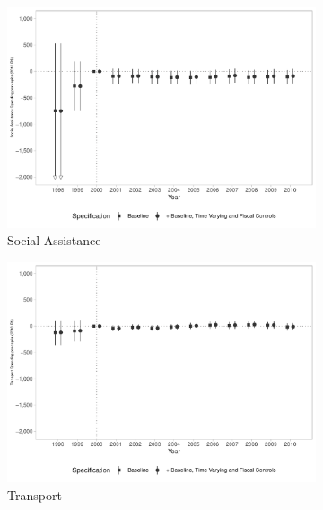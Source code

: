 \begin{figure}[h!]
\begin{center}
\begin{subfigure}{0.48\textwidth}
    \end{subfigure}
    \begin{subfigure}{0.48\textwidth}
        \centering
        \caption{\scriptsize Social Assistance}\label{fig:8c}
        \includegraphics[width=\textwidth]{plots/finbra_desp_assist_prev_pcapita_dist_ec29_baseline_dist_ec29_baseline_8.pdf}
    \end{subfigure}
    \begin{subfigure}{0.48\textwidth}
        \centering
        \caption{\scriptsize Transport}\label{fig:8d}
        \includegraphics[width=\textwidth]{plots/finbra_desp_transporte_pcapita_dist_ec29_baseline_dist_ec29_baseline_8.pdf}
    \end{subfigure}
    \begin{subfigure}{0.48\textwidth}
        \centering

\end{subfigure}
\end{center}
\end{figure}
